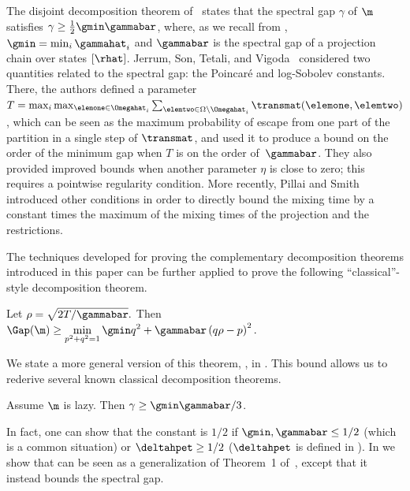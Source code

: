 \documentclass{toc}
\begin{document}
The disjoint decomposition theorem of~\cite{MR00} states that the 
spectral gap $\gamma$ of $\m$ satisfies $\gamma \geq 
\frac{1}{2}\gmin\gammabar$, where, as we recall from 
, $\gmin=\min_i \gammahat_i$ and $\gammabar$ is 
the spectral gap of a projection chain over states $[\rhat]$. Jerrum, 
Son, Tetali, and Vigoda~\cite{jstv04} considered two quantities related 
to the spectral gap: the Poincar\'{e} and log-Sobolev constants.  
There, the authors defined a parameter 
$T=\max_i\max_{\elemone\in\Omegahat_i}\sum_{\elemtwo\in 
\Omega\setminus\Omegahat_i}\transmat(\elemone,\elemtwo)$, which can be 
seen as the maximum probability of escape from one part of the 
partition in a single step of $\transmat$, and used it to produce a 
bound on the order of the minimum gap
when $T$ is on the order of~$\gammabar$.  They also provided 
improved bounds when another parameter $\eta$ is close to zero; this 
requires a pointwise regularity condition. More recently, Pillai and 
Smith~\cite{PS17} introduced other conditions in order to directly 
bound the mixing time by a constant times the maximum of the mixing 
times of the projection and the restrictions.

The techniques developed for proving the complementary decomposition 
theorems introduced in this paper can be further applied to prove the 
following ``classical''-style decomposition theorem.

\begin{theorem}\label{thm:main}
  Let $\rho=\sqrt{2T/\gammabar}.$ Then   $\Gap(\m)\geq \displaystyle\min_{p^2+q^2=1}
\gmin q^2+\gammabar\left(q\rho - p\right)^2.$
%
\end{theorem}
\noindent
 We state a more general version of this theorem, , in
.
This bound allows us to rederive several known classical
decomposition theorems.

\begin{corollary}\label{cor:compareproduct}
  Assume $\m$ is lazy.  Then $\gamma\geq \gmin\gammabar/3$.
\end{corollary}
\noindent In fact, one can show that the constant is $1/2$ if $\gmin,\gammabar\leq 1/2$ (which is a common situation) or $\deltahpet\geq 1/2$ ($\deltahpet$ is defined in ).
In  we show that 
can be seen as a generalization of Theorem~1 of~\cite{jstv04}, except
that it instead bounds the spectral gap.
\end{document}
